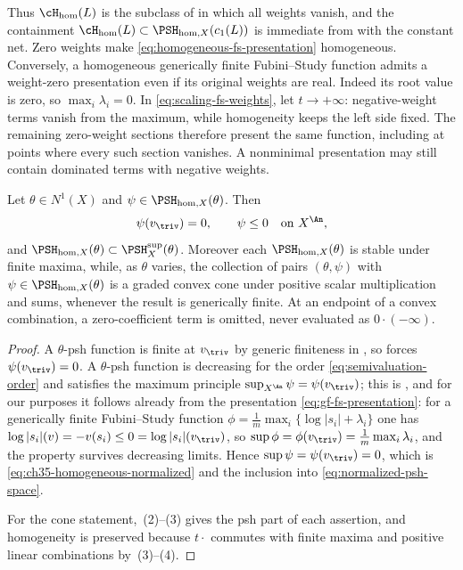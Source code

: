 Thus $\cH_{\mathrm{hom}}(L)$ is the subclass of
 in which all weights vanish, and the containment
$\cH_{\mathrm{hom}}(L)\subset\PSH_{\mathrm{hom},X}(c_1(L))$ is immediate
from  with the constant net.  Zero weights make
\eqref{eq:homogeneous-fs-presentation} homogeneous.  Conversely, a
homogeneous generically finite Fubini--Study function admits a weight-zero
presentation even if its original weights are real. Indeed its root value
is zero, so $\max_i\lambda_i=0$. In
\eqref{eq:scaling-fs-weights}, let $t\to+\infty$: negative-weight terms
vanish from the maximum, while homogeneity keeps the left side fixed.
The remaining zero-weight sections therefore present the same function,
including at points where every such section vanishes. A nonminimal
presentation may still contain dominated terms with negative weights.

\begin{proposition}
\label{prop:ch35-homogeneous-normalization}
Let $\theta\in N^1(X)$ and $\psi\in\PSH_{\mathrm{hom},X}(\theta)$.
Then
\begin{equation}
\label{eq:ch35-homogeneous-normalized}
                     \psi(v_{\triv})=0,\qquad \psi\leq0
                     \quad\text{on }X^{\An},
\end{equation}
and $\PSH_{\mathrm{hom},X}(\theta)\subset\PSH^{\sup}_X(\theta)$.
Moreover each $\PSH_{\mathrm{hom},X}(\theta)$ is stable under finite
maxima, while, as $\theta$ varies, the collection of pairs
$(\theta,\psi)$ with
$\psi\in\PSH_{\mathrm{hom},X}(\theta)$ is a graded convex cone under
positive scalar multiplication and sums, whenever the result is generically
finite.  At an endpoint of a convex combination, a zero-coefficient term is
omitted, never evaluated as $0\cdot(-\infty)$.
\end{proposition}

\begin{proof}
A $\theta$-psh function is finite at $v_{\triv}$ by generic finiteness in
, so  forces
$\psi(v_{\triv})=0$.  A $\theta$-psh function is decreasing for the
order \eqref{eq:semivaluation-order} and satisfies the maximum principle
$\sup_{X^{\An}}\psi=\psi(v_{\triv})$; this is
\cite[Proposition~4.12]{BJ22}, and for our purposes it follows already from
the presentation \eqref{eq:gf-fs-presentation}: for a generically finite
Fubini--Study function $\phi=\frac1m\max_i\{\log|s_i|+\lambda_i\}$ one has
$\log|s_i|(v)=-v(s_i)\leq0=\log|s_i|(v_{\triv})$, so
$\sup\phi=\phi(v_{\triv})=\frac1m\max_i\lambda_i$, and the property
survives decreasing limits.  Hence $\sup\psi=\psi(v_{\triv})=0$, which is
\eqref{eq:ch35-homogeneous-normalized} and the inclusion into
\eqref{eq:normalized-psh-space}.

For the cone statement, \,(2)--(3) gives the psh part
of each assertion, and homogeneity is preserved because
$t\cdot$ commutes with finite maxima and positive linear combinations by
\,(3)--(4).
\end{proof}


